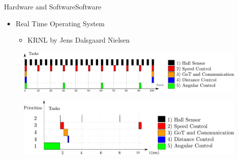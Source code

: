 \begin{frame}{Hardware and Software}{Software}
\begin{itemize}
 \item {Real Time Operating System}
  \begin{itemize}
	\item {KRNL by Jens Dalsgaard Nielsen}
\end{itemize}
\end{itemize}

  \begin{figure}[H]
	\centering
	\includegraphics[scale=0.35]{Pictures/scheduleRequest.pdf}
  \end{figure}

  \begin{figure}[H]
	\centering
	\includegraphics[scale=0.3]{Pictures/schedulePriorities.pdf}
  \end{figure}
\end{frame}
